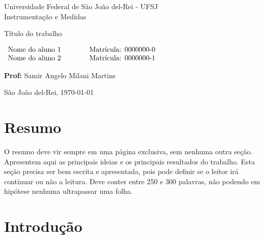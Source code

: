 \documentclass[12pt,titlepage]{article}
\begin{document}
  
   \begin{center}

  \Large
  Universidade Federal de São João del-Rei - UFSJ\\
  Instrumentação e Medidas


  \vspace{3cm}

  {\LARGE Título do trabalho}

  \vspace{3cm}
  
  {\Large $\begin{array}{l c c c r}
           \mbox{Nome do aluno 1}	& & & &	\mbox{Matrícula: 0000000-0} \\
           \mbox{Nome do aluno 2}	& & & &	\mbox{Matrícula: 0000000-1} \\
          \end{array}$}
  
  \vspace{1cm}
          
  {\large \textbf{Prof:} Samir Angelo Milani Martins}
  
  
    \vspace{3cm}
 
  São João del-Rei, \today
\end{center}


\newpage


\tableofcontents

\newpage


\section*{Resumo}

O resumo deve vir sempre em uma página exclusiva, sem 
nenhuma outra seção. Apresentem aqui as principais ideias e os principais 
resultados do trabalho. Esta seção precisa ser bem escrita e apresentada, pois 
pode definir se o leitor irá continuar ou não a leitura. Deve conter entre 250 
e 300 palavras, não podendo em hipótese nenhuma ultrapassar uma folha. 

\newpage


\section{Introdução}
\label{sec:intro}
\end{document}
